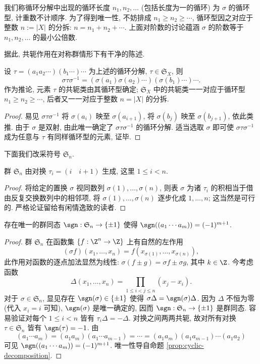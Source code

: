 我们称循环分解中出现的循环长度 $n_1, n_2, \ldots$ (包括长度为一的循环) 为 $\sigma$ 的循环型, 计重数不计顺序. 为了得到唯一性, 不妨排成 $n_1 \geq n_2 \geq \cdots$, 循环型因之对应于整数 $n := |X|$ 的分拆: $n = n_1 + n_2 + \cdots$. 上面对阶数的讨论蕴涵 $\sigma$ 的阶数等于 $n_1, n_2, \ldots$ 的最小公倍数. 

据此, 共轭作用在对称群情形下有干净的陈述.
\begin{lemma}\label{prop:cycle-type}
	设 $\tau = (a_1 a_2 \cdots) (b_1 \cdots) \cdots$ 为上述的循环分解, $\tau \in \mathfrak{S}_X$, 则
	\[ \sigma \tau \sigma^{-1} = (\sigma(a_1) \sigma(a_2) \cdots) (\sigma(b_1) \cdots) \cdots. \]
	作为推论, 元素 $\tau$ 的共轭类由其循环型确定; $\mathfrak{S}_X$ 中的共轭类一一对应于循环型 $n_1 \geq n_2 \geq \cdots$, 后者又一一对应于整数 $n = |X|$ 的分拆.
\end{lemma}
\begin{proof}
	易见 $\sigma \tau \sigma^{-1}$ 将 $\sigma(a_i)$ 映至 $\sigma(a_{i+1})$, 将 $\sigma(b_j)$ 映至 $\sigma(b_{j+1})$, 依此类推. 由于 $\sigma$ 是双射, 由此唯一确定了 $\sigma \tau \sigma^{-1}$ 的循环分解. 适当选取 $\sigma$ 即可使 $\sigma\tau\sigma^{-1}$ 成为任意与 $\tau$ 有同样循环型的元素, 证毕. 
\end{proof}

下面我们改采符号 $\mathfrak{S}_n$.
\begin{lemma}\label{prop:S_n-generation}
	群 $\mathfrak{S}_n$ 由对换 $\tau_i = (i \quad i+1)$ 生成, 这里 $1 \leq i < n$.
\end{lemma}
\begin{proof}
	将给定的置换 $\sigma$ 视同数列 $\sigma(1), \ldots, \sigma(n)$, 则表 $\sigma$ 为诸 $\tau_i$ 的积相当于借由反复交换数列中的相邻项, 将 $\sigma(1), \ldots, \sigma(n)$ 逐步化成 $1, \ldots, n$; 这当然是可行的. 严格论证留给有闲情逸致的读者.
\end{proof}

\begin{lemma}
	存在唯一的群同态 $\sgn: \mathfrak{S}_n \to \{\pm 1\}$ 使得 $\sgn((a_1 \cdots a_m)) = (-1)^{m+1}$.
\end{lemma}
\begin{proof}
	群 $\mathfrak{S}_n$ 在函数集 $\{ f: \Z^n \to \Z\}$ 上有自然的左作用
	\[ (\sigma f)(x_1, \ldots, x_n) = f(x_{\sigma(1)}, \ldots, x_{\sigma(n)}), \]
	此作用对函数的逐点加法显然为线性: $\sigma(f \pm g) = \sigma f \pm \sigma g$, 其中 $k \in \Z$. 今考虑函数
	\[ \Delta(x_1, \ldots, x_n) = \prod_{1 \leq i < j \leq n} (x_j - x_i). \]
	对于 $\sigma \in \mathfrak{S}_n$, 显见存在 $\sgn(\sigma) \in \{\pm 1\}$ 使得 $\sigma \Delta = \sgn(\sigma)\Delta$. 因为 $\Delta$ 不恒为零 (代入 $x_i = i$ 可知), $\sgn(\sigma)$ 是唯一确定的, 因而 $\sgn: \mathfrak{S}_n \to \{\pm1 \}$ 是群同态. 容易验证对每个 $1 \leq i < n$ 皆有 $\tau_i \Delta = -\Delta$. 对换之间两两共轭, 故对所有对换 $\tau \in \mathfrak{S}_n$ 皆有 $\sgn(\tau)=-1$. 由
	\[(a_1 \cdots a_m) = (a_1 a_m) (a_1 \cdots a_{m-1}) = \cdots = (a_1 a_m) (a_1 a_{m-1}) \cdots (a_1 a_2) \]
	可见 $\sgn((a_1 \cdots a_m)) = (-1)^{m+1}$. 唯一性导自命题 \ref{prop:cyclic-decomposition}. 
\end{proof}

